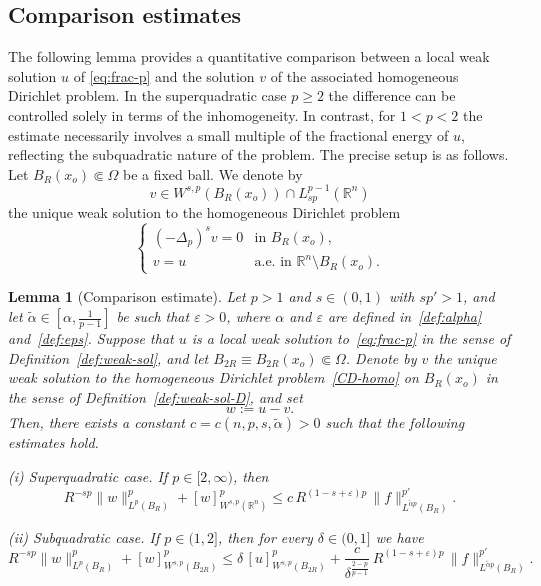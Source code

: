 \documentclass[10pt,letterpaper]{amsart}
\newtheorem{lemma}[theorem]{Lemma}
\theoremstyle{definition}
\numberwithin{theorem}{section}
\numberwithin{equation}{section}
\newcommand{\R}{\ensuremath{\mathbb{R}}}
\newcommand{\1}{\ensuremath{\mathds{1}}}
\renewcommand{\epsilon}{\varepsilon}
\renewcommand{\epsilon}{\varepsilon}
\numberwithin{equation}{section}
\begin{document}
\subsection{Comparison estimates}\label{S:comp-est} 
The following lemma provides a quantitative comparison between a local weak
solution $u$ of \eqref{eq:frac-p} and the solution $v$ of the associated
homogeneous Dirichlet problem. In the superquadratic case $p\ge 2$ the
difference can be controlled solely in terms of the inhomogeneity. In contrast,
for $1<p<2$ the estimate necessarily involves a small multiple of the
fractional energy of $u$, reflecting the subquadratic nature of the problem.
The precise setup is as follows. Let $B_R(x_o)\Subset\Omega$ be a fixed ball.
We denote by
\[
v\in W^{s,p}(B_R(x_o))\cap L^{p-1}_{sp}(\R^n)
\]
the unique weak solution to the homogeneous Dirichlet problem
\begin{equation}\label{CD-homo} 
\left\{
    \begin{array}{cl}
      (-  \Delta_p)^s v  = 0 & \mbox{in $B_R(x_o)$,} \\[6pt]
      v = u & \mbox{a.e.~in $\R^n \setminus B_R(x_o)$.}
    \end{array}
\right.
\end{equation}
\begin{lemma}[Comparison estimate]\label{lem:fract-level-comparison}
Let $p>1$ and $s\in(0,1)$ with $sp'>1$, and let $\tilde\alpha\in[\alpha,\frac{1}{p-1}]$ be such that $\epsilon>0$, where $\alpha$ and $\epsilon$ are defined in~\eqref{def:alpha} and~\eqref{def:eps}.
Suppose that $u$ is a local weak solution to~\eqref{eq:frac-p} in the sense of Definition~\ref{def:weak-sol}, and let $B_{2R} \equiv B_{2R}(x_o) \Subset \Omega$. Denote by $v$ the unique weak solution to the homogeneous Dirichlet problem~\eqref{CD-homo} on $B_R(x_o)$ in the sense of Definition~\ref{def:weak-sol-D}, and set
\[
w := u-v.
\]
Then, there exists a constant $c = c(n,p,s,\tilde \alpha) > 0$ such that the following estimates hold.

\medskip
\noindent
\emph{(i) Superquadratic case.} 
If $p\in[2,\infty)$, then
\[
R^{-sp}\|w\|_{L^p(B_R)}^p + [w]_{W^{s,p}(\R^n)}^p
\le c \, R^{(1-s+\epsilon)p} \, \|f\|_{L^{\tilde\alpha p}(B_R)}^{p'}.
\]

\medskip
\noindent
\emph{(ii) Subquadratic case.} 
If $p\in(1,2]$,  then for every $\delta\in(0,1]$ we have
\[
R^{-sp}\|w\|_{L^p(B_R)}^p + [w]^p_{W^{s,p}(B_{2R})}
\le \delta \, [u]^p_{W^{s,p}(B_{2R})}
+ \frac{c}{\delta^{\frac{2-p}{p-1}}} \, R^{(1-s+\epsilon)p} \, \|f\|_{L^{\tilde\alpha p}(B_R)}^{p'}.
\]
\end{lemma}
\end{document}
